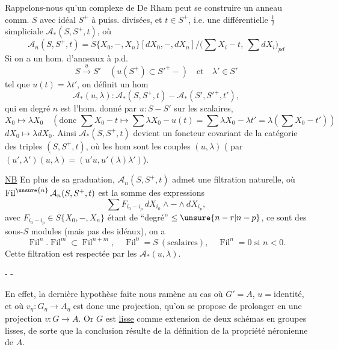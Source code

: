Rappelons-nous qu'un complexe de De Rham peut se construire  un anneau comm. $S$ avec idéal $S^+$ à puiss. divisées, et $t\in S^+$, i.e. une   différentielle  $\frac12$ simpliciale $\mathcal A_*(S,S^+,t)$, où
\[
\mathcal A_n(S,S^+,t)=S\{X_0,-,X_n\}[dX_0,-,dX_n]/\bigl(\sum X_i-t,\ \sum dX_i\bigr)_{pd}
\]
Si on a un hom. d'anneaux à p.d.
\[
S\xrightarrow{u}S'\quad(u(S^+)\subset S'^+-)\quad\text{et}\quad\lambda'\in S'
\]
tel que  $u(t)=\lambda t'$, on définit un hom 
\[
\mathcal A_*(u,\lambda):\mathcal A_*(S,S^+,t)-\mathcal A_*(S',S'^+,t'),
\]
qui en degré $n$ est l'hom.
donné par  $u:S-S'$ sur les scalaires,
\[
X_0\longmapsto\lambda X_0\quad\left(\text{donc }\sum X_0-t\longmapsto\sum\lambda X_0-u(t)=\sum\lambda X_0-\lambda t'=\lambda(\sum X_0-t')\right)
\]
$dX_0\longmapsto\lambda dX_0$. Ainsi $\mathcal A_*(S,S^+,t)$ devient un foncteur covariant de la catégorie des triples $(S,S^+,t)$, où les hom sont les couples $(u,\lambda)$  ( par $(u',\lambda')(u,\lambda)=(u'u,u'(\lambda)\lambda')$).

\uline{NB} En plus de sa graduation, $\mathcal A_n(S,S^+,t)$ admet une filtration  naturelle, où $\operatorname{Fil}^{\unsure{n}}\mathcal A_n(S,S^+,t)$ est la somme des expressions
\[
\sum F_{i_0- i_p}\,dX_{i_0}\wedge-\wedge dX_{i_p},
\]
avec $F_{i_0-i_p}\in S\{X_0,-,X_n\}$ étant de ``degré'' $\leq\unsure{n-r|n-p}$, ce sont des sous-$S$ modules (mais pas des idéaux), on a
\[
\operatorname{Fil}^n.\operatorname{Fil}^m\subset\operatorname{Fil}^{n+m},\quad\operatorname{Fil}^0=S\ (\text{scalaires}),\quad\operatorname{Fil}^n=0\text{ si }n<0.
\]
Cette filtration est respectée par les $\mathcal A_*(u,\lambda)$.

\begin{center}-  -\end{center}

En effet, la dernière hypothèse faite nous ramène au cas où $G'=A$, $u=\text{identité}$, et où $v_\eta:G_\eta\longrightarrow A_\eta$ est donc une projection, qu'on se propose de prolonger en une projection $v:G\longrightarrow A$. Or $G$ est \uline{lisse} comme extension de deux schémas en groupes lisses, de sorte que la conclusion résulte de la définition de la propriété néronienne de $A$.

